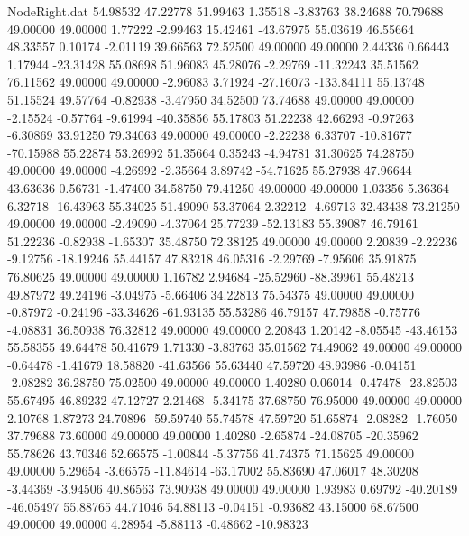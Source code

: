 \begin{filecontents}{NodeRight.dat}
  54.98532   47.22778   51.99463     1.35518   -3.83763   38.24688   70.79688   49.00000   49.00000    1.77222   -2.99463   15.42461  -43.67975
  55.03619   46.55664   48.33557     0.10174   -2.01119   39.66563   72.52500   49.00000   49.00000    2.44336    0.66443    1.17944  -23.31428
  55.08698   51.96083   45.28076    -2.29769  -11.32243   35.51562   76.11562   49.00000   49.00000   -2.96083    3.71924  -27.16073 -133.84111
  55.13748   51.15524   49.57764    -0.82938   -3.47950   34.52500   73.74688   49.00000   49.00000   -2.15524   -0.57764   -9.61994  -40.35856
  55.17803   51.22238   42.66293    -0.97263   -6.30869   33.91250   79.34063   49.00000   49.00000   -2.22238    6.33707  -10.81677  -70.15988
  55.22874   53.26992   51.35664     0.35243   -4.94781   31.30625   74.28750   49.00000   49.00000   -4.26992   -2.35664    3.89742  -54.71625
  55.27938   47.96644   43.63636     0.56731   -1.47400   34.58750   79.41250   49.00000   49.00000    1.03356    5.36364    6.32718  -16.43963
  55.34025   51.49090   53.37064     2.32212   -4.69713   32.43438   73.21250   49.00000   49.00000   -2.49090   -4.37064   25.77239  -52.13183
  55.39087   46.79161   51.22236    -0.82938   -1.65307   35.48750   72.38125   49.00000   49.00000    2.20839   -2.22236   -9.12756  -18.19246
  55.44157   47.83218   46.05316    -2.29769   -7.95606   35.91875   76.80625   49.00000   49.00000    1.16782    2.94684  -25.52960  -88.39961
  55.48213   49.87972   49.24196    -3.04975   -5.66406   34.22813   75.54375   49.00000   49.00000   -0.87972   -0.24196  -33.34626  -61.93135
  55.53286   46.79157   47.79858    -0.75776   -4.08831   36.50938   76.32812   49.00000   49.00000    2.20843    1.20142   -8.05545  -43.46153
  55.58355   49.64478   50.41679     1.71330   -3.83763   35.01562   74.49062   49.00000   49.00000   -0.64478   -1.41679   18.58820  -41.63566
  55.63440   47.59720   48.93986    -0.04151   -2.08282   36.28750   75.02500   49.00000   49.00000    1.40280    0.06014   -0.47478  -23.82503
  55.67495   46.89232   47.12727     2.21468   -5.34175   37.68750   76.95000   49.00000   49.00000    2.10768    1.87273   24.70896  -59.59740
  55.74578   47.59720   51.65874    -2.08282   -1.76050   37.79688   73.60000   49.00000   49.00000    1.40280   -2.65874  -24.08705  -20.35962
  55.78626   43.70346   52.66575    -1.00844   -5.37756   41.74375   71.15625   49.00000   49.00000    5.29654   -3.66575  -11.84614  -63.17002
  55.83690   47.06017   48.30208    -3.44369   -3.94506   40.86563   73.90938   49.00000   49.00000    1.93983    0.69792  -40.20189  -46.05497
  55.88765   44.71046   54.88113    -0.04151   -0.93682   43.15000   68.67500   49.00000   49.00000    4.28954   -5.88113   -0.48662  -10.98323

\end{filecontents}
